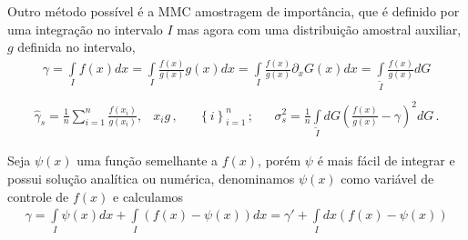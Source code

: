\documentclass{article}
\begin{document}
Outro método possível é a MMC amostragem de importância, que é definido por uma integração no intervalo $I$ mas agora com uma distribuição amostral auxiliar, $g$ definida no intervalo,
\begin{align*}
    \gamma=\int\limits_{I}f\left(x\right)dx=\int\limits_{I}\frac{f(x)}{g(x)}g(x)dx=\int\limits_{I}\frac{f(x)}{g(x)}\partial_xG(x)dx=\int\limits_{\tilde{I}}\frac{f(x)}{g(x)}dG\\
\end{align*}
\begin{align*}
    \hat{\gamma}_s=\frac{1}{n}\sum_{i=1}^{n}\frac{f\left(x_i\right)}{g\left(x_i\right)},&x_ig\,,&&\left\{i\right\}_{i=1}^{n}\,;&&\sigma_s^2=\frac{1}{n}\int\limits_{\tilde{I}}dG\left(\frac{f(x)}{g(x)}-\gamma\right)^2dG\,.
\end{align*}

Seja $\psi(x)$ uma função semelhante a $f(x)$, porém $\psi$ é mais fácil de integrar e possui solução analítica ou numérica, denominamos $\psi(x)$ como variável de controle de $f(x)$ e calculamos
\begin{align*}
    \gamma=\int\limits_{I}\psi(x)dx+\int\limits_{I}\left(f(x)-\psi(x)\right)dx=\gamma'+\int\limits_{I}dx\left(f(x)-\psi(x)\right)
\end{align*}
\end{document}
